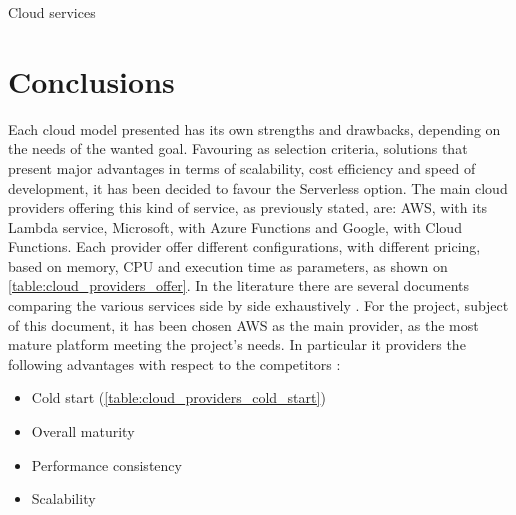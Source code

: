 \begin{chapter}{Cloud services}
    \section{Conclusions}
    Each cloud model presented has its own strengths and drawbacks, depending on the
    needs of the wanted goal. Favouring as selection criteria, solutions that present
    major advantages in terms of scalability, cost efficiency and speed of development,
    it has been decided to favour the Serverless option.
    The main cloud providers offering this kind of service, as previously stated,
    are: AWS, with its Lambda service, Microsoft, with Azure Functions and Google,
    with Cloud Functions. Each provider offer different configurations, with different
    pricing, based on memory, CPU and execution time as parameters, as shown on
    \ref{table:cloud_providers_offer}.
    In the literature there are several documents comparing the various services
    side by side exhaustively \cite{sls_providers_comparison}.
    For the project, subject of this document, it has been chosen AWS as the main
    provider, as the most mature platform meeting the project's needs. In particular
    it providers the following advantages with respect to the competitors
    \cite{sls_providers_comparison}:
    \begin{itemize}
        \item Cold start (\ref{table:cloud_providers_cold_start})
        \item Overall maturity
        \item Performance consistency
        \item Scalability
    \end{itemize}

    \begin{table}
        \centering
        \begin{tabularx}{0.8\textwidth}{
                | >{\raggedright\arraybackslash}X
                | >{\centering\arraybackslash}X
                | >{\centering\arraybackslash}X
                | >{\centering\arraybackslash}X |
            }


\end{tabularx}
\end{table}
\end{chapter}
